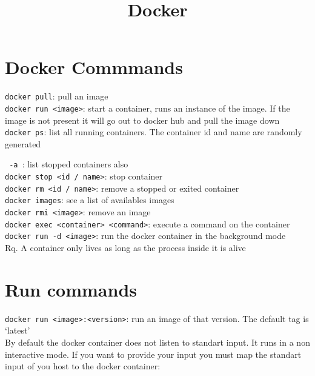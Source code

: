 \documentclass[french]{article}
\title{Docker}
\begin{document}
\date{}

\maketitle

\section{Docker Commmands}

\verb|docker pull|: pull an image\\

\verb|docker run <image>|: start a container, runs an instance of the image. If the image is not present it will go out to docker hub and pull the image down\\

\verb|docker ps|: list all running containers. The container id and name are randomly generated

\verb| -a |: list stopped containers also\\

\verb|docker stop <id / name>|: stop container\\

\verb|docker rm <id / name>|: remove a stopped or exited container\\

\verb|docker images|: see a list of availables images\\

\verb|docker rmi <image>|: remove an image\\

\verb|docker exec <container> <command>|: execute a command on the container\\

\verb|docker run -d <image>|: run the docker container in the background mode\\

Rq. A container only lives as long as the process inside it is alive

\section{Run commands}

\verb|docker run <image>:<version>|: run an image of that version. The default tag is `latest'\\

By default the docker container does not listen to standart input. It runs in a non interactive mode. If you want to provide your input you must map the standart input of you host to the docker container:\\
\end{document}
